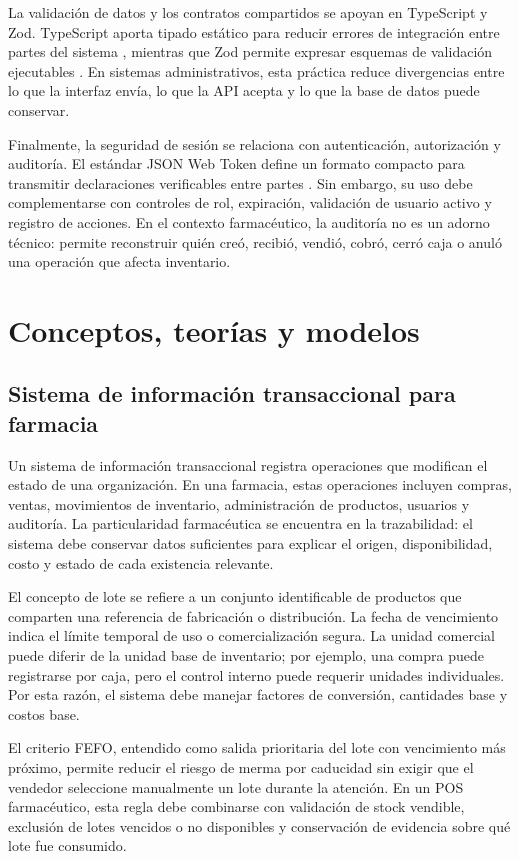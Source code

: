 La validación de datos y los contratos compartidos se apoyan en TypeScript y Zod. TypeScript aporta tipado estático para reducir errores de integración entre partes del sistema \parencite{typescript2026handbook}, mientras que Zod permite expresar esquemas de validación ejecutables \parencite{zod2026docs}. En sistemas administrativos, esta práctica reduce divergencias entre lo que la interfaz envía, lo que la API acepta y lo que la base de datos puede conservar.

Finalmente, la seguridad de sesión se relaciona con autenticación, autorización y auditoría. El estándar JSON Web Token define un formato compacto para transmitir declaraciones verificables entre partes \parencite{rfc7519}. Sin embargo, su uso debe complementarse con controles de rol, expiración, validación de usuario activo y registro de acciones. En el contexto farmacéutico, la auditoría no es un adorno técnico: permite reconstruir quién creó, recibió, vendió, cobró, cerró caja o anuló una operación que afecta inventario.

\section{Conceptos, teorías y modelos}

\subsection{Sistema de información transaccional para farmacia}

Un sistema de información transaccional registra operaciones que modifican el estado de una organización. En una farmacia, estas operaciones incluyen compras, ventas, movimientos de inventario, administración de productos, usuarios y auditoría. La particularidad farmacéutica se encuentra en la trazabilidad: el sistema debe conservar datos suficientes para explicar el origen, disponibilidad, costo y estado de cada existencia relevante.

El concepto de lote se refiere a un conjunto identificable de productos que comparten una referencia de fabricación o distribución. La fecha de vencimiento indica el límite temporal de uso o comercialización segura. La unidad comercial puede diferir de la unidad base de inventario; por ejemplo, una compra puede registrarse por caja, pero el control interno puede requerir unidades individuales. Por esta razón, el sistema debe manejar factores de conversión, cantidades base y costos base.

El criterio FEFO, entendido como salida prioritaria del lote con vencimiento más próximo, permite reducir el riesgo de merma por caducidad sin exigir que el vendedor seleccione manualmente un lote durante la atención. En un POS farmacéutico, esta regla debe combinarse con validación de stock vendible, exclusión de lotes vencidos o no disponibles y conservación de evidencia sobre qué lote fue consumido.

